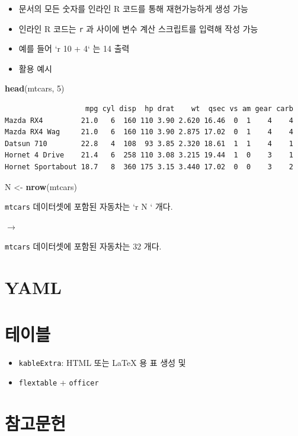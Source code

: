 \documentclass[
  11pt,
]{krantz}
\newenvironment{Shaded}{\begin{snugshade}}{\end{snugshade}}
\newcommand{\DecValTok}[1]{\textcolor[rgb]{0.06,0.06,0.06}{#1}}
\newcommand{\KeywordTok}[1]{\textcolor[rgb]{0.27,0.27,0.27}{\textbf{#1}}}
\newcommand{\NormalTok}[1]{#1}
\newcommand{\StringTok}[1]{\textcolor[rgb]{0.5,0.5,0.5}{#1}}
\providecommand{\tightlist}{%
  \setlength{\itemsep}{0pt}\setlength{\parskip}{0pt}}
\begin{document}
\begin{itemize}
\tightlist
\item
  문서의 모든 숫자를 인라인 R 코드를 통해 재현가능하게 생성 가능
\item
  인라인 R 코드는 \texttt{\textasciigrave{}r} 과 \texttt{\textasciigrave{}} 사이에 변수 계산 스크립트를 입력해 작성 가능
\item
  예를 들어 {`}r 10 + 4` 는 14 출력
\item
  활용 예시
\end{itemize}

\footnotesize

\begin{Shaded}
\begin{Highlighting}[]
\KeywordTok{head}\NormalTok{(mtcars, }\DecValTok{5}\NormalTok{)}
\end{Highlighting}
\end{Shaded}

\begin{verbatim}
                   mpg cyl disp  hp drat    wt  qsec vs am gear carb
Mazda RX4         21.0   6  160 110 3.90 2.620 16.46  0  1    4    4
Mazda RX4 Wag     21.0   6  160 110 3.90 2.875 17.02  0  1    4    4
Datsun 710        22.8   4  108  93 3.85 2.320 18.61  1  1    4    1
Hornet 4 Drive    21.4   6  258 110 3.08 3.215 19.44  1  0    3    1
Hornet Sportabout 18.7   8  360 175 3.15 3.440 17.02  0  0    3    2
\end{verbatim}

\begin{Shaded}
\begin{Highlighting}[]
\NormalTok{N <-}\StringTok{ }\KeywordTok{nrow}\NormalTok{(mtcars)}
\end{Highlighting}
\end{Shaded}

\normalsize

\texttt{mtcars} 데이터셋에 포함된 자동차는 {`}r N ` 개다.

\(\rightarrow\)

\texttt{mtcars} 데이터셋에 포함된 자동차는 32 개다.

\hypertarget{yaml}{%
\section{YAML}\label{yaml}}

\hypertarget{rmarkdown-table}{%
\section{테이블}\label{rmarkdown-table}}

\begin{itemize}
\tightlist
\item
  \texttt{kableExtra}: HTML 또는 LaTeX 용 표 생성 및
\item
  \texttt{flextable} + \texttt{officer}
\end{itemize}

\hypertarget{rmarkdown-reference}{%
\section{참고문헌}\label{rmarkdown-reference}}

  

\printindex
\end{document}
